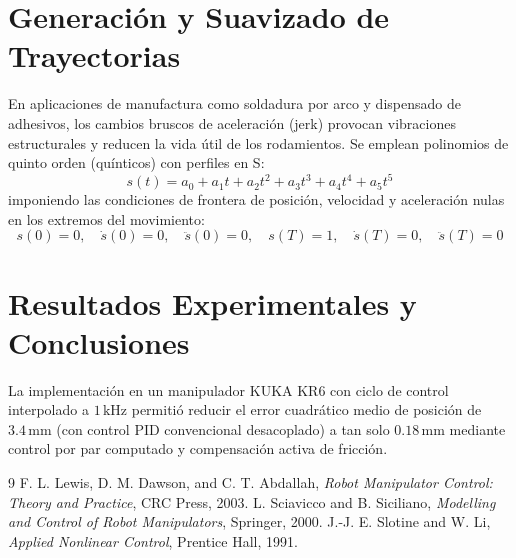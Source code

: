 \documentclass[11pt,a4paper]{article}
\begin{document}
\section{Generación y Suavizado de Trayectorias}
En aplicaciones de manufactura como soldadura por arco y dispensado de adhesivos, los cambios bruscos de aceleración (jerk) provocan vibraciones estructurales y reducen la vida útil de los rodamientos. Se emplean polinomios de quinto orden (quínticos) con perfiles en S:
\begin{equation}
s(t) = a_0 + a_1 t + a_2 t^2 + a_3 t^3 + a_4 t^4 + a_5 t^5
\end{equation}
imponiendo las condiciones de frontera de posición, velocidad y aceleración nulas en los extremos del movimiento:
\begin{equation}
s(0) = 0, \quad \dot{s}(0) = 0, \quad \ddot{s}(0) = 0, \quad s(T) = 1, \quad \dot{s}(T) = 0, \quad \ddot{s}(T) = 0
\end{equation}

\section{Resultados Experimentales y Conclusiones}
La implementación en un manipulador KUKA KR6 con ciclo de control interpolado a $1\,\text{kHz}$ permitió reducir el error cuadrático medio de posición de $3.4\,\text{mm}$ (con control PID convencional desacoplado) a tan solo $0.18\,\text{mm}$ mediante control por par computado y compensación activa de fricción.

\begin{thebibliography}{9}
 F. L. Lewis, D. M. Dawson, and C. T. Abdallah, \textit{Robot Manipulator Control: Theory and Practice}, CRC Press, 2003.
 L. Sciavicco and B. Siciliano, \textit{Modelling and Control of Robot Manipulators}, Springer, 2000.
 J.-J. E. Slotine and W. Li, \textit{Applied Nonlinear Control}, Prentice Hall, 1991.
\end{thebibliography}
\end{document}
